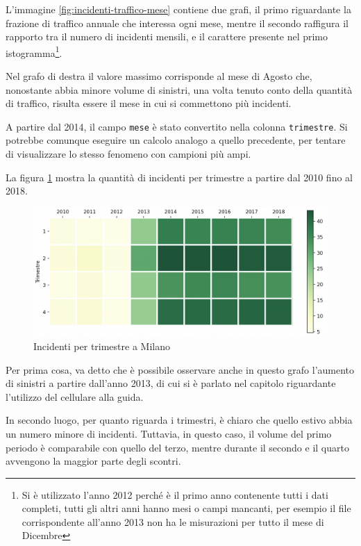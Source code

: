 \documentclass[a4paper,12pt]{report}
\newcommand{\columnstyle}[1]{\texttt{#1}}
\newcommand{\skipline}{\vspace{0.2in}}
\begin{document}
L'immagine \ref{fig:incidenti-traffico-mese} contiene due grafi, 
il primo riguardante la frazione di traffico annuale che interessa ogni mese, 
mentre il secondo raffigura il rapporto tra il numero di incidenti mensili, 
e il carattere presente nel primo
istogramma\footnote{Si è utilizzato l'anno 2012 perché è il primo anno contenente 
tutti i dati completi, tutti gli altri anni hanno mesi o campi mancanti, 
per esempio il file corrispondente all'anno 
2013 non ha le misurazioni per tutto il mese di Dicembre}. 

Nel grafo di destra il valore massimo corrisponde al mese di Agosto 
che, nonostante abbia minore volume di sinistri, 
una volta tenuto conto della quantità di traffico, risulta essere 
il mese in cui si commettono più incidenti. 

\skipline
A partire dal 2014, il campo \columnstyle{mese} è stato convertito nella 
colonna \columnstyle{trimestre}. 
Si potrebbe comunque eseguire un calcolo analogo a quello precedente, 
per tentare di visualizzare lo stesso fenomeno con campioni più ampi. 

La figura \ref{fig:milano-trimestri} mostra la quantità di incidenti per 
trimestre a partire dal 2010 fino al 2018. 

\begin{figure}
    \includegraphics[width=\linewidth]{../src/incidenti/incidenti_senza_coords/mese_incidenti/trimestri.png}
    \caption{Incidenti per trimestre a Milano}
    \label{fig:milano-trimestri}
\end{figure}

Per prima cosa, va detto che è possibile osservare anche in questo grafo 
l'aumento di sinistri a partire dall'anno 2013, di cui si è parlato nel capitolo 
riguardante l'utilizzo del cellulare alla guida. 

In secondo luogo, per quanto riguarda i trimestri, è chiaro che quello estivo abbia 
un numero minore di incidenti. 
Tuttavia, in questo caso, il volume del primo periodo è comparabile 
con quello del terzo, 
mentre durante il secondo e il quarto avvengono la maggior parte degli scontri. 
\end{document}

